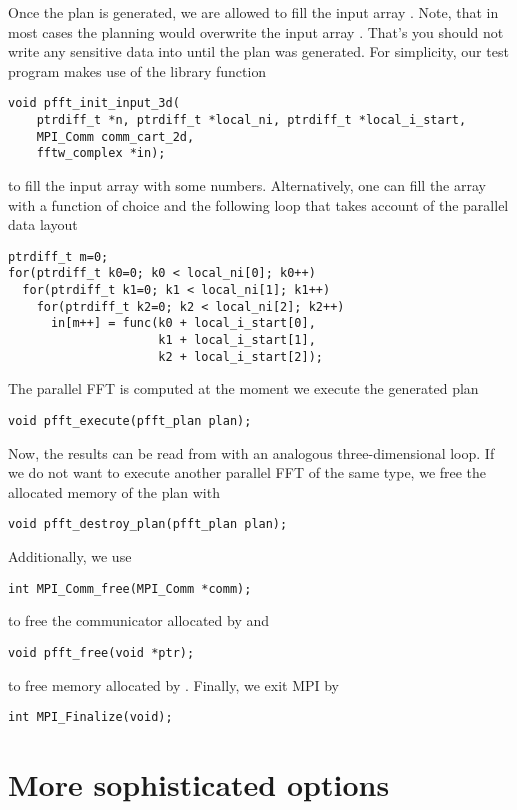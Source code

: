 Once the plan is generated, we are allowed to fill the input array . Note, that in most cases
the planning  would overwrite the input array . That's you should not
write any sensitive data into  until the plan was generated.
For simplicity, our test program makes use of the library function
\begin{lstlisting}
void pfft_init_input_3d(
    ptrdiff_t *n, ptrdiff_t *local_ni, ptrdiff_t *local_i_start,
    MPI_Comm comm_cart_2d,
    fftw_complex *in);
\end{lstlisting}
to fill the input array with some numbers. Alternatively, one can fill the array with a function  of choice
and the following loop that takes account of the parallel data layout
\begin{lstlisting}
ptrdiff_t m=0;
for(ptrdiff_t k0=0; k0 < local_ni[0]; k0++)
  for(ptrdiff_t k1=0; k1 < local_ni[1]; k1++)
    for(ptrdiff_t k2=0; k2 < local_ni[2]; k2++)
      in[m++] = func(k0 + local_i_start[0],
                     k1 + local_i_start[1],
                     k2 + local_i_start[2]);
\end{lstlisting}
The parallel FFT is computed at the moment we execute the generated plan
\begin{lstlisting}
void pfft_execute(pfft_plan plan);
\end{lstlisting}
Now, the results can be read from  with an analogous three-dimensional loop.
If we do not want to execute another parallel FFT of the same type, we free the allocated memory of the plan with
\begin{lstlisting}
void pfft_destroy_plan(pfft_plan plan);
\end{lstlisting}
Additionally, we use
\begin{lstlisting}
int MPI_Comm_free(MPI_Comm *comm);  
\end{lstlisting}
to free the communicator allocated by  and
\begin{lstlisting}
void pfft_free(void *ptr);
\end{lstlisting}
to free memory allocated by .
Finally, we exit MPI by
\begin{lstlisting}
int MPI_Finalize(void);
\end{lstlisting}

\section{More sophisticated options}

